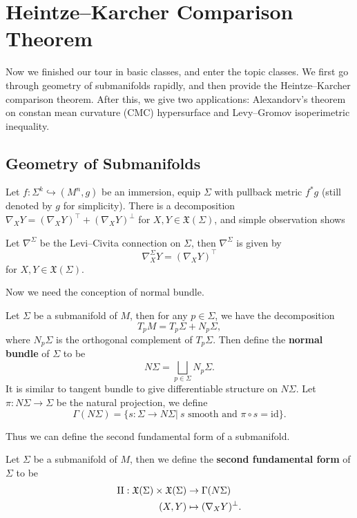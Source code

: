 \chapter{Heintze--Karcher Comparison Theorem}

Now we finished our tour in basic classes, and enter the topic classes.
We first go through geometry of submanifolds rapidly, and then provide the Heintze--Karcher comparison theorem.
After this, we give two applications:
Alexandorv's theorem on constan mean curvature (CMC) hypersurface and Levy--Gromov isoperimetric inequality.

\section{Geometry of Submanifolds}

Let $f:\Sigma^k\hookrightarrow(M^n,g)$ be an immersion, equip $\Sigma$ with pullback metric $f^*g$ (still denoted by $g$ for simplicity).
There is a decomposition $\nabla_XY=(\nabla_XY)^\top+(\nabla_XY)^\perp$ for $X,Y\in\mathfrak{X}(\Sigma)$, and simple observation shows
\begin{prop}
    Let $\nabla^\Sigma$ be the Levi--Civita connection on $\Sigma$, then $\nabla^\Sigma$ is given by
    \[\nabla^\Sigma_XY=(\nabla_XY)^\top\]
    for $X,Y\in\mathfrak{X}(\Sigma)$.
\end{prop}

Now we need the conception of normal bundle.
\begin{defn}
    Let $\Sigma$ be a submanifold of $M$, then for any $p\in\Sigma$, we have the decomposition
    \[T_pM=T_p\Sigma+N_p\Sigma,\]
    where $N_p\Sigma$ is the orthogonal complement of $T_p\Sigma$.
    Then define the \textbf{normal bundle} of $\Sigma$ to be
    \[N\Sigma=\bigsqcup_{p\in\Sigma}N_p\Sigma.\]
    It is similar to tangent bundle to give differentiable structure on $N\Sigma$.
    Let $\pi:N\Sigma\to\Sigma$ be the natural projection, we define
    \[\Gamma(N\Sigma)=\{s:\Sigma\to N\Sigma|\ s\text{ smooth and }\pi\circ s=\mathrm{id}\}.\]
\end{defn}

Thus we can define the second fundamental form of a submanifold.
\begin{defn}
    Let $\Sigma$ be a submanifold of $M$, then we define the \textbf{second fundamental form} of $\Sigma$ to be
    \begin{align*}
        \operatorname{II}:\mathfrak{X}(\Sigma)\times\mathfrak{X}(\Sigma)&\to\Gamma(N\Sigma)\\
        (X,Y)&\mapsto(\nabla_XY)^\perp.
    \end{align*}
\end{defn}


